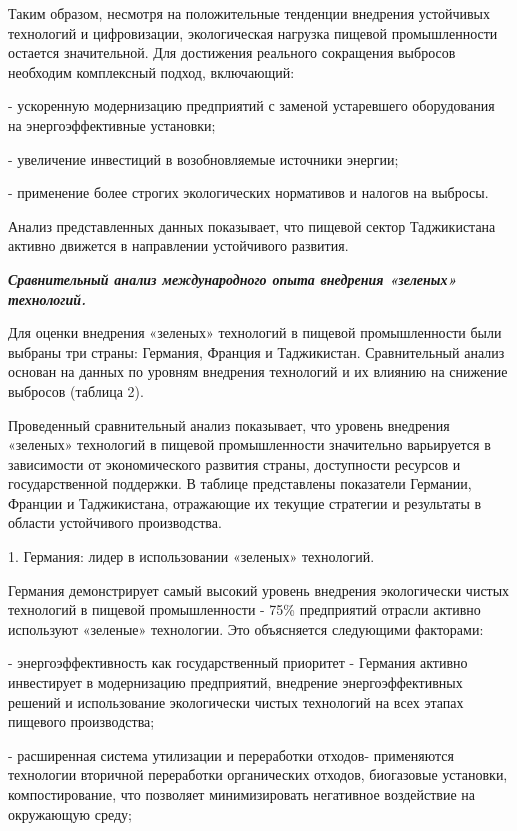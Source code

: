 \begin{multicols}{2}
Таким образом, несмотря на положительные тенденции внедрения устойчивых
технологий и цифровизации, экологическая нагрузка пищевой промышленности
остается значительной. Для достижения реального сокращения выбросов
необходим комплексный подход, включающий:

- ускоренную модернизацию предприятий с заменой устаревшего оборудования
на энергоэффективные установки;

- увеличение инвестиций в возобновляемые источники энергии;

- применение более строгих экологических нормативов и налогов на выбросы.

Анализ представленных данных показывает, что пищевой сектор Таджикистана
активно движется в направлении устойчивого развития.

\emph{{\bfseries Сравнительный анализ международного опыта внедрения
«зеленых» технологий.}}

Для оценки внедрения «зеленых» технологий в пищевой промышленности были
выбраны три страны: Германия, Франция и Таджикистан. Сравнительный
анализ основан на данных по уровням внедрения технологий и их влиянию на
снижение выбросов (таблица 2).

Проведенный сравнительный анализ показывает, что уровень внедрения
«зеленых» технологий в пищевой промышленности значительно варьируется в
зависимости от экономического развития страны, доступности ресурсов и
государственной поддержки. В таблице представлены показатели Германии,
Франции и Таджикистана, отражающие их текущие стратегии и результаты в
области устойчивого производства.

1. Германия: лидер в использовании «зеленых» технологий.

Германия демонстрирует самый высокий уровень внедрения экологически
чистых технологий в пищевой промышленности - 75\% предприятий отрасли
активно используют «зеленые» технологии. Это объясняется следующими
факторами:

- энергоэффективность как государственный приоритет - Германия активно
инвестирует в модернизацию предприятий, внедрение энергоэффективных
решений и использование экологически чистых технологий на всех этапах
пищевого производства;

- расширенная система утилизации и переработки отходов- применяются
технологии вторичной переработки органических отходов, биогазовые
установки, компостирование, что позволяет минимизировать негативное
воздействие на окружающую среду;


\end{multicols}
